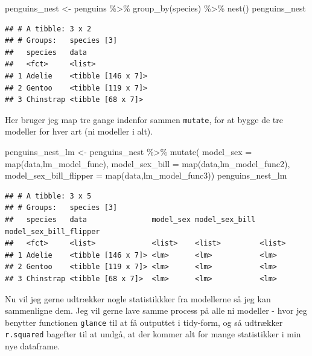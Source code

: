 \documentclass[
]{book}
\newenvironment{Shaded}{\begin{snugshade}}{\end{snugshade}}
\newcommand{\AttributeTok}[1]{\textcolor[rgb]{0.77,0.63,0.00}{#1}}
\newcommand{\FunctionTok}[1]{\textcolor[rgb]{0.00,0.00,0.00}{#1}}
\newcommand{\NormalTok}[1]{#1}
\newcommand{\OtherTok}[1]{\textcolor[rgb]{0.56,0.35,0.01}{#1}}
\newcommand{\SpecialCharTok}[1]{\textcolor[rgb]{0.00,0.00,0.00}{#1}}
\begin{document}
\begin{Shaded}
\begin{Highlighting}[]
\NormalTok{penguins\_nest }\OtherTok{\textless{}{-}}\NormalTok{ penguins }\SpecialCharTok{\%\textgreater{}\%} 
  \FunctionTok{group\_by}\NormalTok{(species) }\SpecialCharTok{\%\textgreater{}\%}
  \FunctionTok{nest}\NormalTok{()}
\NormalTok{penguins\_nest}
\end{Highlighting}
\end{Shaded}

\begin{verbatim}
## # A tibble: 3 x 2
## # Groups:   species [3]
##   species   data              
##   <fct>     <list>            
## 1 Adelie    <tibble [146 x 7]>
## 2 Gentoo    <tibble [119 x 7]>
## 3 Chinstrap <tibble [68 x 7]>
\end{verbatim}

Her bruger jeg map tre gange indenfor sammen \texttt{mutate}, for at bygge de tre modeller for hver art (ni modeller i alt).

\begin{Shaded}
\begin{Highlighting}[]
\NormalTok{penguins\_nest\_lm }\OtherTok{\textless{}{-}}\NormalTok{ penguins\_nest }\SpecialCharTok{\%\textgreater{}\%} 
  \FunctionTok{mutate}\NormalTok{(}
    \AttributeTok{model\_sex =}              \FunctionTok{map}\NormalTok{(data,lm\_model\_func),}
    \AttributeTok{model\_sex\_bill =}         \FunctionTok{map}\NormalTok{(data,lm\_model\_func2),}
    \AttributeTok{model\_sex\_bill\_flipper =} \FunctionTok{map}\NormalTok{(data,lm\_model\_func3))}
\NormalTok{penguins\_nest\_lm}
\end{Highlighting}
\end{Shaded}

\begin{verbatim}
## # A tibble: 3 x 5
## # Groups:   species [3]
##   species   data               model_sex model_sex_bill model_sex_bill_flipper
##   <fct>     <list>             <list>    <list>         <list>                
## 1 Adelie    <tibble [146 x 7]> <lm>      <lm>           <lm>                  
## 2 Gentoo    <tibble [119 x 7]> <lm>      <lm>           <lm>                  
## 3 Chinstrap <tibble [68 x 7]>  <lm>      <lm>           <lm>
\end{verbatim}

Nu vil jeg gerne udtrækker nogle statistikkker fra modellerne så jeg kan sammenligne dem. Jeg vil gerne lave samme process på alle ni modeller - hvor jeg benytter functionen \texttt{glance} til at få outputtet i tidy-form, og så udtrækker \texttt{r.squared} bagefter til at undgå, at der kommer alt for mange statistikker i min nye dataframe.
\end{document}
